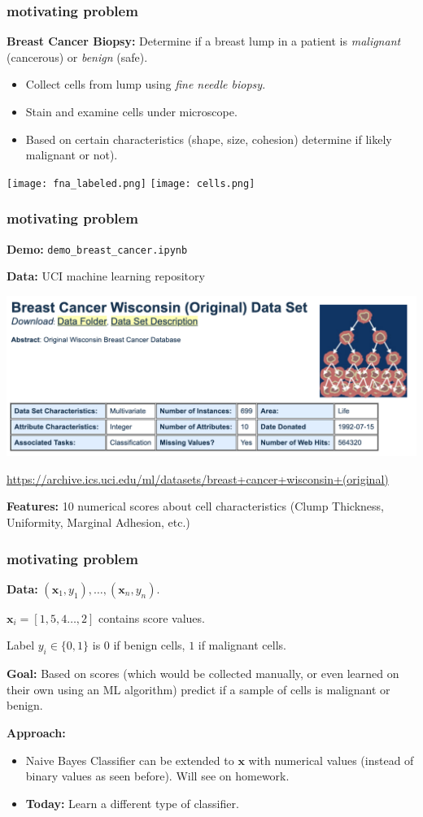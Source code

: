 \documentclass[handout,compress]{beamer}
\newcommand{\bv}[1]{\mathbf{#1}}
\begin{document}
\begin{frame}
	\frametitle{motivating problem}
	\textbf{Breast Cancer Biopsy:} Determine if a breast lump in a patient is \emph{malignant} (cancerous) or \emph{benign} (safe). 
	\begin{itemize}
		\item Collect cells from lump using \emph{fine needle biopsy}.
		\item Stain and examine cells under microscope.
		\item Based on certain characteristics (shape, size, cohesion) determine if likely malignant or not).
	\end{itemize}
\begin{center}
	\texttt{[image: fna\_labeled.png]} \texttt{[image: cells.png]}
\end{center}
\end{frame}

\begin{frame}
	\frametitle{motivating problem}
	\textbf{Demo:} \texttt{demo\_breast\_cancer.ipynb}
	
	\textbf{Data:} UCI machine learning repository
	\begin{center}
		\includegraphics[width=.9\textwidth]{uci_cancer.png}
		
		\footnotesize{\url{https://archive.ics.uci.edu/ml/datasets/breast+cancer+wisconsin+(original)}}
	\end{center}

	\textbf{Features:} 10 numerical scores about cell characteristics (Clump Thickness, Uniformity, Marginal Adhesion, etc.)
	
\end{frame}

\begin{frame}
	\frametitle{motivating problem}
	\textbf{Data:} $(\bv{x}_1, y_1), \ldots, (\bv{x}_n, y_n)$. 
	
	$\bv{x}_i = [1,5,4\ldots, 2]$ contains score values. 
	
	Label $y_i\in \{0,1\}$ is $0$ if benign cells, $1$ if malignant cells.
	
	\textbf{Goal:} Based on scores (which would be collected manually, or even learned on their own using an ML algorithm) predict if a sample of cells is malignant or benign. 
	
	\textbf{Approach:}
	\begin{itemize}
		\item Naive Bayes Classifier can be extended to $\bv{x}$ with numerical values (instead of binary values as seen before).  Will see on homework.
		\item \textbf{Today:} Learn a different type of classifier.
	\end{itemize}
\end{frame}
\end{document}
